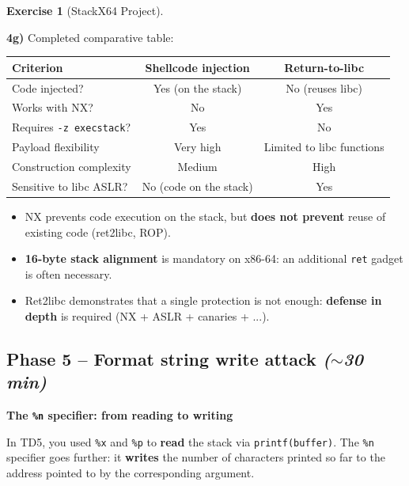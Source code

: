 \documentclass[a4paper,11pt]{article}
\theoremstyle{plain}
\theoremstyle{definition}
\newtheorem{exercice}{Exercise}
\begin{document}
\begin{exercice}[StackX64 Project]
\begin{correction}
\textbf{4g)} Completed comparative table:
\begin{center}
\begin{tabular}{lcc}
\toprule
\textbf{Criterion} & \textbf{Shellcode injection} & \textbf{Return-to-libc} \\
\midrule
Code injected? & Yes (on the stack) & No (reuses libc) \\
Works with NX? & No & Yes \\
Requires \texttt{-z execstack}? & Yes & No \\
Payload flexibility & Very high & Limited to libc functions \\
Construction complexity & Medium & High \\
Sensitive to libc ASLR? & No (code on the stack) & Yes \\
\bottomrule
\end{tabular}
\end{center}

\begin{pointcle}
\begin{itemize}
    \item NX prevents code execution on the stack, but \textbf{does not prevent} reuse of existing code (ret2libc, ROP).
    \item \textbf{16-byte stack alignment} is mandatory on x86-64: an additional \texttt{ret} gadget is often necessary.
    \item Ret2libc demonstrates that a single protection is not enough: \textbf{defense in depth} is required (NX + ASLR + canaries + ...).
\end{itemize}
\end{pointcle}

\end{correction}



\subsection*{Phase 5 -- Format string write attack \hfill\normalfont\textit{($\sim$30 min)}}

\begin{rappel}
\textbf{The \texttt{\%n} specifier: from reading to writing}

In TD5, you used \texttt{\%x} and \texttt{\%p} to \textbf{read} the stack via \texttt{printf(buffer)}. The \texttt{\%n} specifier goes further: it \textbf{writes} the number of characters printed so far to the address pointed to by the corresponding argument.


\end{rappel}
\end{exercice}
\end{document}
